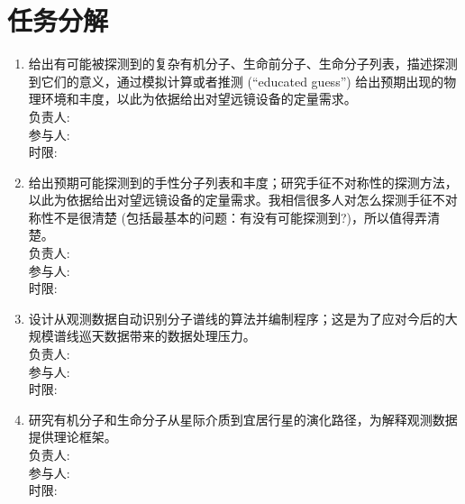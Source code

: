 \documentclass{article}
\begin{document}
\section{任务分解}

\begin{enumerate}
  \item 给出有可能被探测到的复杂有机分子、生命前分子、生命分子列表，描述探测到它们的意义，通过模拟计算或者推测 (“educated guess”) 给出预期出现的物理环境和丰度，以此为依据给出对望远镜设备的定量需求。\\
  负责人: \\
  参与人: \\
  时限:
  \item 给出预期可能探测到的手性分子列表和丰度；研究手征不对称性的探测方法，以此为依据给出对望远镜设备的定量需求。我相信很多人对怎么探测手征不对称性不是很清楚 (包括最基本的问题：有没有可能探测到?)，所以值得弄清楚。\\
  负责人: \\
  参与人: \\
  时限:
  \item 设计从观测数据自动识别分子谱线的算法并编制程序；这是为了应对今后的大规模谱线巡天数据带来的数据处理压力。\\
  负责人: \\
  参与人: \\
  时限:
  \item 研究有机分子和生命分子从星际介质到宜居行星的演化路径，为解释观测数据提供理论框架。\\
  负责人: \\
  参与人: \\
  时限:
\end{enumerate}
\end{document}
